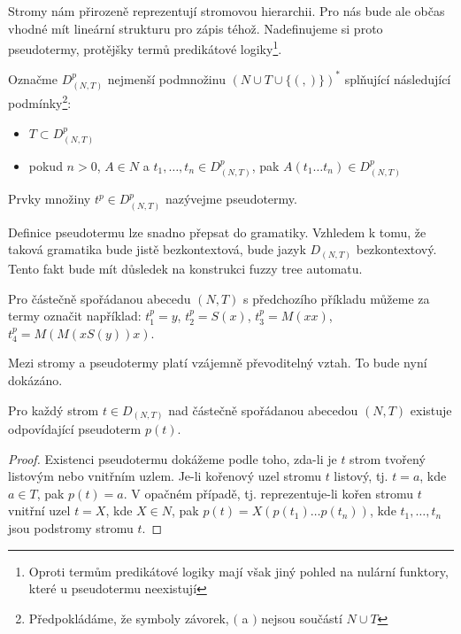 \documentclass[a4paper,10pt]{article}
\begin{document}
Stromy nám přirozeně reprezentují stromovou hierarchii. Pro nás bude ale občas vhodné mít lineární strukturu pro zápis téhož. Nadefinujeme si proto pseudotermy, protějšky termů predikátové logiky\footnote{Oproti termům predikátové logiky mají však jiný pohled na nulární funktory, které u pseudotermu neexistují}.

\begin{definition}[Pseudoterm]
 Označme $D_{(N,T)}^p$ nejmenší podmnožinu
 $(N \cup T \cup \{ (, ) \})^*$ splňující následující podmínky\footnote{
    Předpokládáme, že symboly závorek, $($ a $)$ nejsou součástí $N \cup T$}:
 \begin{itemize}
  \item $T \subset D_{(N,T)}^p$
  \item pokud $n > 0$, $A \in N$ a $t_1, \dots, t_n \in D_{(N,T)}^p$, pak $A(t_1 \dots t_n) \in D_{(N,T)}^p$ 
 \end{itemize}
 Prvky množiny $t^p \in D_{(N,T)}^p$ nazývejme pseudotermy.
\end{definition}

\begin{note}
  Definice pseudotermu lze snadno přepsat do gramatiky. Vzhledem k tomu, že taková gramatika bude jistě bezkontextová, bude jazyk $D_{(N, T)}$ bezkontextový. Tento fakt bude mít důsledek na konstrukci fuzzy tree automatu.
\end{note}

\begin{example} \label{ex:PseTerms}
 Pro částečně spořádanou abecedu $(N, T)$ s předchozího příkladu můžeme za termy označit například: $t^p_1 = y$, $t^p_2 = S(x)$, $t^p_3 = M(x x)$, $t^p_4 = M(M(x S(y)) x)$.
\end{example}

Mezi stromy a pseudotermy platí vzájemně převoditelný vztah. To bude nyní dokázáno.

\begin{theorem}
 Pro každý strom $t \in D_{(N,T)}$ nad částečně spořádanou abecedou $(N, T)$ existuje odpovídající pseudoterm $p(t)$.
\end{theorem}
\begin{proof}
 Existenci pseudotermu dokážeme podle toho, zda-li je $t$ strom tvořený listovým nebo vnitřním uzlem. Je-li kořenový uzel stromu $t$ listový, tj. $t = a$, kde $a \in T$, pak $p(t) = a$. V opačném případě, tj. reprezentuje-li kořen stromu $t$ vnitřní uzel $t = X$, kde $X \in N$, pak $p(t) = X(p(t_1) \dots p(t_n))$, kde $t_1, \dots, t_n$ jsou podstromy stromu $t$.
\end{proof}
\end{document}
